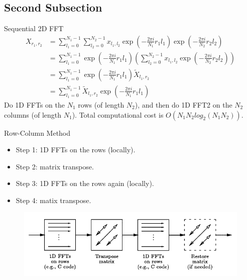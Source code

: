 \documentclass{beamer}
\begin{document}
\subsection{Second Subsection}

\begin{frame}{Sequential 2D FFT}
\vspace{-1cm}
\begin{align*}
X_{r_1,r_2}&=\sum_{l_1=0}^{N_1-1}\sum_{l_2=0}^{N_2-1}x_{l_1,l_2}\exp({-\frac{2\pi i}{N_1}r_1l_1})\exp({-\frac{2\pi i}{N_2}r_2l_2})\\
&=\sum_{l_1=0}^{N_1-1}\exp({-\frac{2\pi i}{N_1}r_1l_1})\left(\sum_{l_2=0}^{N_2-1}x_{l_1,l_2}\exp({-\frac{2\pi i}{N_2}r_2l_2})\right)\\
&= \sum_{l_1=0}^{N_1-1}\exp({-\frac{2\pi i}{N_1}r_1l_1})\tilde{X}_{l_1,r_2}\\
&=\sum_{l_1=0}^{N_1-1}\tilde{X}_{l_1,r_2}\exp({-\frac{2\pi i}{N_1}r_1l_1})
\end{align*}
Do 1D FFTs on the $N_1$ rows (of length $N_2$), and then do 1D FFT2 on the $N_2$ columns (of length $N_1$). Total computational cost is  $O(N_1N_2log_2(N_1N_2))$.
\end{frame}

\begin{frame}{Row-Column Method}
\begin{itemize}
\item Step 1: 1D FFTs on the rows (locally).
\item Step 2: matrix transpose.
\item Step 3: 1D FFTs on the rows again (locally).
\item Step 4: matix transpose.
\end{itemize}
\begin{figure}
\includegraphics[width=\linewidth]{fft1.png}
\end{figure}
\end{frame}
\end{document}
